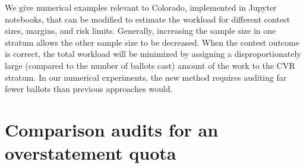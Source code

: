 \documentclass[runningheads]{llncs}
\begin{document}
We give numerical examples relevant to Colorado, implemented in Jupyter notebooks, that can be modified to estimate the workload for different contest sizes, margins, and risk limits.
Generally, increasing the sample size in one stratum allows the other sample size to be decreased.
When the contest outcome is correct, the total workload will be minimized by 
assigning a disproportionately large (compared to the number of ballots cast) amount of 
the work to the CVR stratum.
In our numerical experiments, the new method requires auditing far fewer ballots than previous approaches would. 

\appendix
\section{Comparison audits for an overstatement quota}\label{sec:appendix-comparison}
\end{document}
